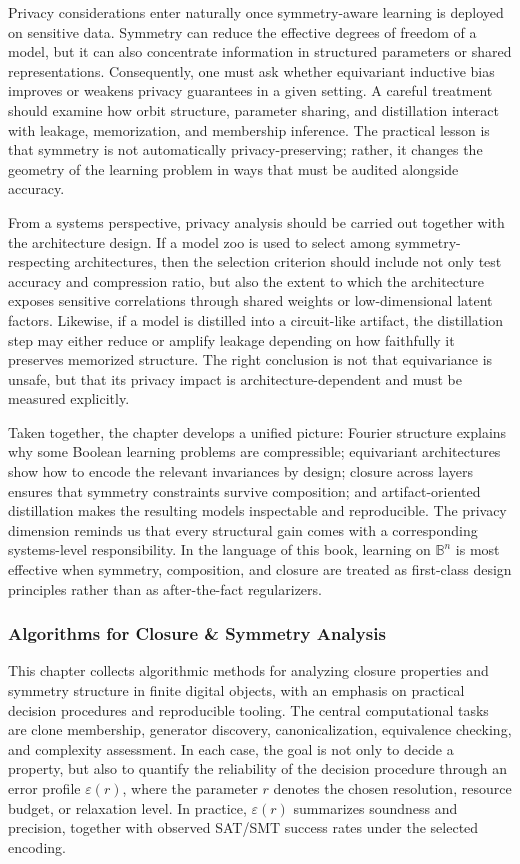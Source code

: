\documentclass[11pt]{article}
\begin{document}
Privacy considerations enter naturally once symmetry-aware learning is deployed on sensitive data. Symmetry can reduce the effective degrees of freedom of a model, but it can also concentrate information in structured parameters or shared representations. Consequently, one must ask whether equivariant inductive bias improves or weakens privacy guarantees in a given setting. A careful treatment should examine how orbit structure, parameter sharing, and distillation interact with leakage, memorization, and membership inference. The practical lesson is that symmetry is not automatically privacy-preserving; rather, it changes the geometry of the learning problem in ways that must be audited alongside accuracy.

From a systems perspective, privacy analysis should be carried out together with the architecture design. If a model zoo is used to select among symmetry-respecting architectures, then the selection criterion should include not only test accuracy and compression ratio, but also the extent to which the architecture exposes sensitive correlations through shared weights or low-dimensional latent factors. Likewise, if a model is distilled into a circuit-like artifact, the distillation step may either reduce or amplify leakage depending on how faithfully it preserves memorized structure. The right conclusion is not that equivariance is unsafe, but that its privacy impact is architecture-dependent and must be measured explicitly.

Taken together, the chapter develops a unified picture: Fourier structure explains why some Boolean learning problems are compressible; equivariant architectures show how to encode the relevant invariances by design; closure across layers ensures that symmetry constraints survive composition; and artifact-oriented distillation makes the resulting models inspectable and reproducible. The privacy dimension reminds us that every structural gain comes with a corresponding systems-level responsibility. In the language of this book, learning on \(\mathbb{B}^n\) is most effective when symmetry, composition, and closure are treated as first-class design principles rather than as after-the-fact regularizers.


\subsubsection{Algorithms for Closure \& Symmetry Analysis}

This chapter collects algorithmic methods for analyzing closure properties and symmetry structure in finite digital objects, with an emphasis on practical decision procedures and reproducible tooling. The central computational tasks are clone membership, generator discovery, canonicalization, equivalence checking, and complexity assessment. In each case, the goal is not only to decide a property, but also to quantify the reliability of the decision procedure through an error profile \(\varepsilon(r)\), where the parameter \(r\) denotes the chosen resolution, resource budget, or relaxation level. In practice, \(\varepsilon(r)\) summarizes soundness and precision, together with observed SAT/SMT success rates under the selected encoding.
\end{document}
